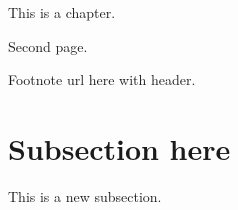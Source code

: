 
This is a chapter.

\newpage

Second page.

Footnote url here with header.

\KittelEquationExpandedX

\section{Subsection here}
\label{sec:subsection-here}

This is a new subsection.

\clearpage
